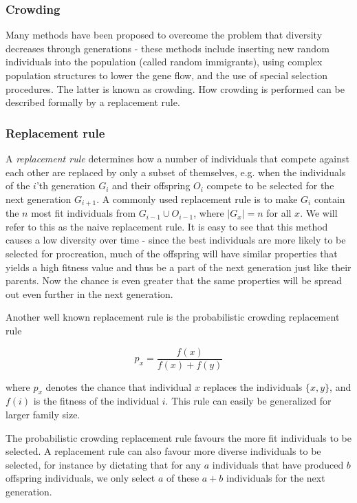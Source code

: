 \subsubsection{Crowding}
Many methods have been proposed to overcome the problem that diversity decreases through generations - these methods include inserting new random individuals into the population (called random immigrants), using complex population structures to lower the gene flow, and the use of special selection procedures\cite{ursem2002diversity}. The latter is known as crowding. 
How crowding is performed can be described formally by a replacement rule.

\subsubsection{Replacement rule}
A \emph{replacement rule} determines how a number of individuals that compete against each other are replaced by only a subset of themselves, e.g. when the individuals of the $i$'th generation $G_i$ and their offspring $O_i$ compete to be selected for the next generation $G_{i+1}$.
A commonly used replacement rule is to make $G_i$ contain the $n$ most fit individuals from $G_{i-1} \cup O_{i-1}$, where $|G_x| = n$ for all $x$\cite{masterThesisGANN}. We will refer to this as the naive replacement rule.
It is easy to see that this method causes a low diversity over time - since the best individuals are more likely to be selected for procreation, much of the offspring will have similar properties that yields a high fitness value and thus be a part of the next generation just like their parents. Now the chance is even greater that the same properties will be spread out even further in the next generation.

Another well known replacement rule is the probabilistic crowding replacement rule\cite{Mengshoel_and_Goldberg:1999}

\[p_x = \frac{f(x)}{f(x)+f(y)}\]

where $p_x$ denotes the chance that individual $x$ replaces the individuals $\{x, y\}$, and $f(i)$ is the fitness of the individual $i$. This rule can easily be generalized for larger family size. 

The probabilistic crowding replacement rule favours the more fit individuals to be selected.
A replacement rule can also favour more diverse individuals to be selected, for instance by dictating that for any $a$ individuals that have produced $b$ offspring individuals, we only select $a$ of these $a+b$ individuals for the next generation.

